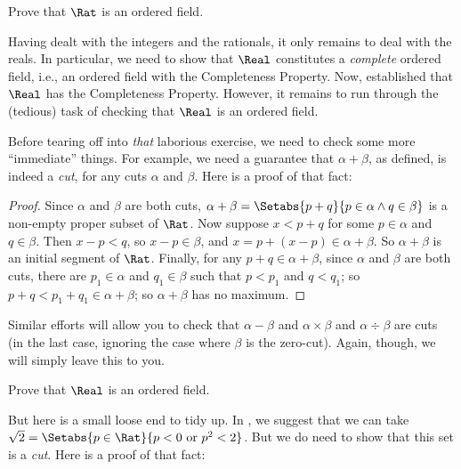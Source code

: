 \documentclass[../../../include/open-logic-section]{subfiles}
\begin{document}
\begin{prob}
Prove that $\Rat$ is an ordered field.
\end{prob}

Having dealt with the integers and the rationals, it only remains to
deal with the reals. In particular, we need to show that $\Real$
constitutes a \emph{complete} ordered field, i.e., an ordered field
with the Completeness Property. Now, 
established that $\Real$ has the Completeness Property. However, it
remains to run through the (tedious) task of checking that $\Real$ is an
ordered field. 

Before tearing off into \emph{that} laborious exercise, we need to
check some more ``immediate'' things. For example, we need a guarantee
that $\alpha + \beta$, as defined, is indeed a \emph{cut}, for any
cuts $\alpha$ and $\beta$. Here is a proof of that fact:

\begin{proof}	
Since $\alpha$ and $\beta$ are both cuts, $\alpha + \beta = \Setabs{p
+ q}{p \in \alpha \land q \in \beta}$ is a non-empty proper subset of
$\Rat$. Now suppose $x < p + q$ for some $p \in \alpha$ and $q \in \beta$.
Then $x - p < q$, so $x - p \in \beta$, and $x = p + (x - p) \in
\alpha + \beta$. So $\alpha + \beta$ is an initial segment of $\Rat$.
Finally, for any $p + q \in \alpha + \beta$, since $\alpha$ and
$\beta$ are both cuts, there are $p_1 \in \alpha$ and $q_1 \in \beta$
such that $p < p_1$ and $q < q_1$; so $p + q < p_1 + q_1 \in \alpha +
\beta$; so $\alpha + \beta$ has no maximum. 
\end{proof}

Similar efforts will allow you to check that $\alpha - \beta$ and
$\alpha \times \beta$ and $\alpha \div \beta$ are cuts (in the last
case, ignoring the case where $\beta$ is the zero-cut). Again, though,
we will simply leave this to you. 

\begin{prob}
Prove that $\Real$ is an ordered field.
\end{prob}

But here is a small loose end to tidy up. In
, we suggest that we can take $\sqrt{2} =
\Setabs{p \in \Rat}{p < 0 \text{ or }p^2 < 2}$. But we do need to show
that this set is a \emph{cut}. Here is a proof of that fact:
\end{document}
